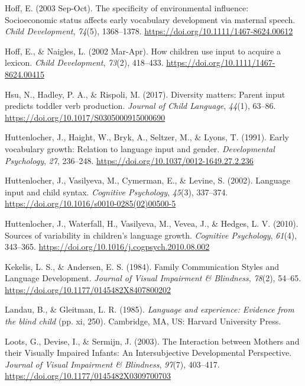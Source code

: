 \documentclass[
  man,floatsintext]{apa6}
\newlength{\cslhangindent}
\newlength{\cslentryspacingunit} %
\newenvironment{CSLReferences}[2] %
 {%
  \setlength{\parindent}{0pt}
  \ifodd #1
  \let\oldpar\par
  \def\par{\hangindent=\cslhangindent\oldpar}
  \fi
  \setlength{\parskip}{#2\cslentryspacingunit}
 }%
 {}
\begin{document}
\begin{CSLReferences}{1}{0}
\leavevmode{}%
Hoff, E. (2003 Sep-Oct). The specificity of environmental influence: Socioeconomic status affects early vocabulary development via maternal speech. \emph{Child Development}, \emph{74}(5), 1368--1378. \url{https://doi.org/10.1111/1467-8624.00612}

\leavevmode{}%
Hoff, E., \& Naigles, L. (2002 Mar-Apr). How children use input to acquire a lexicon. \emph{Child Development}, \emph{73}(2), 418--433. \url{https://doi.org/10.1111/1467-8624.00415}

\leavevmode{}%
Hsu, N., Hadley, P. A., \& Rispoli, M. (2017). Diversity matters: Parent input predicts toddler verb production. \emph{Journal of Child Language}, \emph{44}(1), 63--86. \url{https://doi.org/10.1017/S0305000915000690}

\leavevmode{}%
Huttenlocher, J., Haight, W., Bryk, A., Seltzer, M., \& Lyons, T. (1991). Early vocabulary growth: {Relation} to language input and gender. \emph{Developmental Psychology}, \emph{27}, 236--248. \url{https://doi.org/10.1037/0012-1649.27.2.236}

\leavevmode{}%
Huttenlocher, J., Vasilyeva, M., Cymerman, E., \& Levine, S. (2002). Language input and child syntax. \emph{Cognitive Psychology}, \emph{45}(3), 337--374. \url{https://doi.org/10.1016/s0010-0285(02)00500-5}

\leavevmode{}%
Huttenlocher, J., Waterfall, H., Vasilyeva, M., Vevea, J., \& Hedges, L. V. (2010). Sources of variability in children's language growth. \emph{Cognitive Psychology}, \emph{61}(4), 343--365. \url{https://doi.org/10.1016/j.cogpsych.2010.08.002}

\leavevmode{}%
Kekelis, L. S., \& Andersen, E. S. (1984). Family {Communication Styles} and {Language Development}. \emph{Journal of Visual Impairment \& Blindness}, \emph{78}(2), 54--65. \url{https://doi.org/10.1177/0145482X8407800202}

\leavevmode{}%
Landau, B., \& Gleitman, L. R. (1985). \emph{Language and experience: {Evidence} from the blind child} (pp. xi, 250). {Cambridge, MA, US}: {Harvard University Press}.

\leavevmode{}%
Loots, G., Devise, I., \& Sermijn, J. (2003). The {Interaction} between {Mothers} and their {Visually Impaired Infants}: {An Intersubjective Developmental Perspective}. \emph{Journal of Visual Impairment \& Blindness}, \emph{97}(7), 403--417. \url{https://doi.org/10.1177/0145482X0309700703}


\end{CSLReferences}
\end{document}
